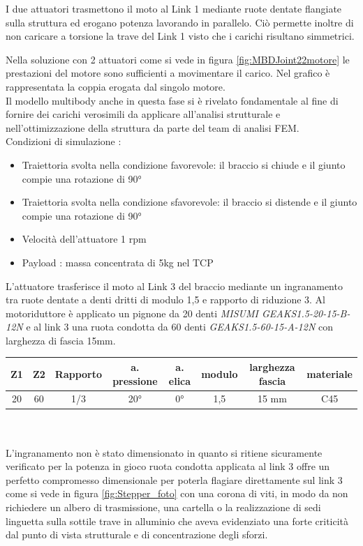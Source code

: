 \documentclass[%
corpo=11pt,
twoside,
 stile=classica,
oldstyle,
greek,%
]{toptesi}
\begin{document}
		
		I due attuatori trasmettono il moto al Link 1 mediante ruote dentate flangiate sulla struttura ed erogano potenza lavorando in parallelo. Ciò permette inoltre di non caricare a torsione la trave del Link 1 visto che i carichi risultano simmetrici. 
		
		Nella soluzione con 2 attuatori come si vede in figura \ref{fig:MBDJoint22motore} le prestazioni del motore sono sufficienti a movimentare il carico. Nel grafico è rappresentata la coppia erogata dal singolo motore.\\
		Il modello multibody anche in questa fase si è rivelato fondamentale al fine di fornire dei carichi verosimili da applicare all'analisi strutturale e nell'ottimizzazione della struttura da parte del team di analisi FEM. 
		\\
			Condizioni di simulazione :
		\begin{itemize}
			\item Traiettoria svolta nella condizione favorevole: il braccio si chiude e il giunto compie una rotazione di 90° 
			\item Traiettoria svolta nella condizione sfavorevole: il braccio si distende e il giunto compie una rotazione di 90° 
			\item Velocità dell'attuatore 1 rpm
			\item Payload : massa concentrata di 5kg nel TCP 
		\end{itemize}
		L'attuatore trasferisce il moto al Link 3 del braccio mediante un ingranamento tra ruote dentate a denti dritti di modulo 1,5 e rapporto di riduzione 3. Al motoriduttore è applicato un pignone da 20 denti \textit{MISUMI GEAKS1.5-20-15-B-12N} e al link 3 una ruota condotta da 60 denti \textit{GEAKS1.5-60-15-A-12N} con larghezza di fascia 15mm. \\
		
			\begin{tabular}{|c|c|c|c|c|c|c|c|}
			
			\hline
			Z1 & Z2 & Rapporto & a. pressione & a. elica & modulo & larghezza fascia & materiale \\
			\hline
			20 & 60 & 1/3 & 20° & 0°  & 1,5 & 15 mm & C45  \\
			\hline
			
		\end{tabular}
		\\
		\\
		L'ingranamento non è stato dimensionato in quanto si ritiene sicuramente verificato per la potenza in gioco  ruota condotta applicata al link 3 offre un perfetto compromesso dimensionale per poterla flagiare direttamente sul link 3 come si vede in figura \ref{fig:Stepper_foto} con una corona di viti, in modo da non richiedere un albero di trasmissione, una cartella o la realizzazione di sedi linguetta sulla sottile trave in alluminio che aveva evidenziato una forte criticità dal punto di vista strutturale e di concentrazione degli sforzi. \\
		
\end{document}
